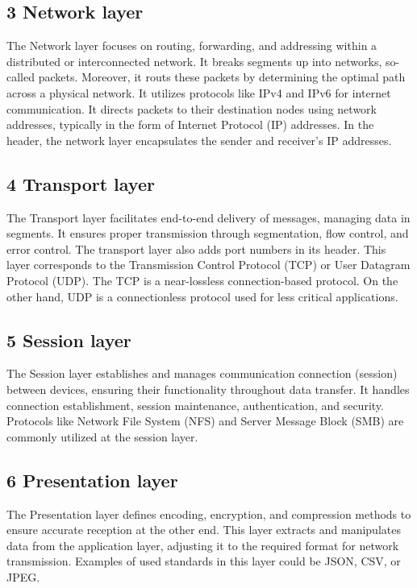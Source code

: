 \documentclass[conference]{IEEEtran}
\begin{document}
\subsection{3 Network layer}
The Network layer focuses on routing, forwarding, and addressing within a distributed or interconnected network. It breaks segments up into networks, so-called packets. Moreover, it routs these packets by determining the optimal path across a physical network. It utilizes protocols like IPv4 and IPv6 for internet communication. It directs packets to their destination nodes using network addresses, typically in the form of Internet Protocol (IP) addresses. In the header, the network layer encapsulates the sender and receiver's IP addresses.

\subsection{4 Transport layer}
The Transport layer facilitates end-to-end delivery of messages, managing data in segments. It ensures proper transmission through segmentation, flow control, and error control. The transport layer also adds port numbers in its header. This layer corresponds to the Transmission Control Protocol (TCP) or User Datagram Protocol (UDP). The TCP is a near-lossless connection-based protocol. On the other hand, UDP is a connectionless protocol used for less critical applications.

\subsection{5 Session layer}
The Session layer establishes and manages communication connection (session) between devices, ensuring their functionality throughout data transfer. It handles connection establishment, session maintenance, authentication, and security. Protocols like Network File System (NFS) and Server Message Block (SMB) are commonly utilized at the session layer.

\subsection{6 Presentation layer}
The Presentation layer defines encoding, encryption, and compression methods to ensure accurate reception at the other end. This layer extracts and manipulates data from the application layer, adjusting it to the required format for network transmission. Examples of used standards in this layer could be JSON, CSV, or JPEG.
\end{document}
